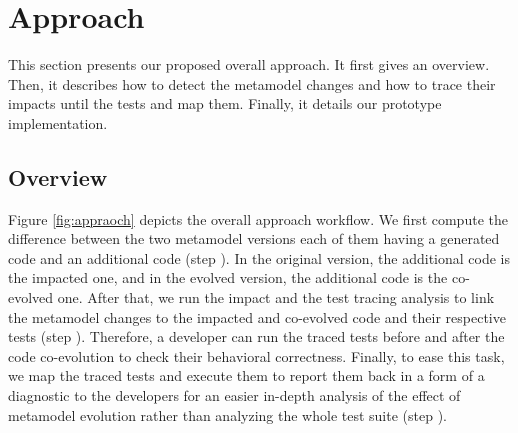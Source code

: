 \section{Approach}
\label{sec_approach}
This section presents our proposed overall approach. It first gives an overview. Then, it describes how to detect the metamodel changes and how to trace their impacts until the tests and map them. Finally, it details our prototype implementation. 




\subsection{Overview}


Figure \ref{fig:appraoch} depicts the overall approach workflow. We first compute the difference between the two metamodel versions each of them having a generated code and an additional code (step {\small{}}). In the original version, the additional code is the impacted one, and in the evolved version, the additional code is the co-evolved one. 
After that, we run the impact and the test tracing analysis to link the metamodel changes to the impacted and co-evolved code and their respective tests (step {\small{}}). Therefore, a developer can run the traced tests before and after the code co-evolution to check their behavioral correctness. Finally, to ease this task, we map the traced tests and execute them to report them back in a form of a diagnostic to the developers for an easier in-depth analysis of the effect of metamodel evolution rather than analyzing the whole test suite (step {\small{}}). 


